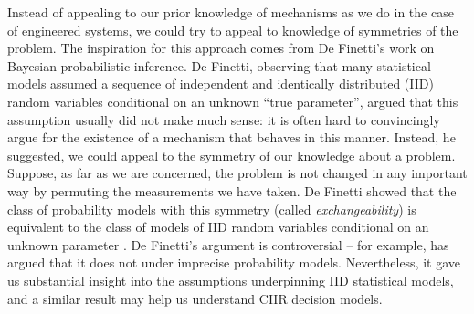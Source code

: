 Instead of appealing to our prior knowledge of mechanisms as we do in the case of engineered systems, we could try to appeal to knowledge of symmetries of the problem. The inspiration for this approach comes from De Finetti's work on Bayesian probabilistic inference. De Finetti, observing that many statistical models assumed a sequence of independent and identically distributed (IID) random variables conditional on an unknown ``true parameter'', argued that this assumption usually did not make much sense: it is often hard to convincingly argue for the existence of a mechanism that behaves in this manner. Instead, he suggested, we could appeal to the symmetry of our knowledge about a problem. Suppose, as far as we are concerned, the problem is not changed in any important way by permuting the measurements we have taken. De Finetti showed that the class of probability models with this symmetry (called \emph{exchangeability}) is equivalent to the class of models of IID random variables conditional on an unknown parameter \citep{de_finetti_foresight_1992}. De Finetti's argument is controversial -- for example, \citet{walley_statistical_1991} has argued that it does not under imprecise probability models. Nevertheless, it gave us substantial insight into the assumptions underpinning IID statistical models, and a similar result may help us understand CIIR decision models.


